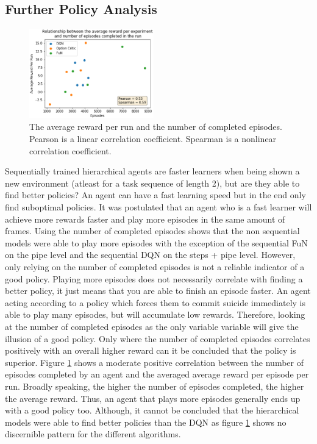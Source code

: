 \documentclass[notitlepage,a4paper,11pt]{article}
\begin{document}
\subsection{Further Policy Analysis}
\begin{figure}
\vspace{-40pt}
  \begin{center}
    \includegraphics[width=0.48\textwidth]{figs/good_policy.eps}
  \end{center}
  \vspace{-20pt}
  \caption{The average reward per run and the number of completed episodes. Pearson is a linear correlation coefficient. Spearman is a nonlinear correlation coefficient.}
  \label{fig:good_policy}
\end{figure}

Sequentially trained hierarchical agents are faster learners when being shown a new environment (atleast for a task sequence of length 2), but are they able to find better policies? An agent can have a fast learning speed but in the end only find suboptimal policies. It was postulated that an agent who is a fast learner will achieve more rewards faster and play more episodes in the same amount of frames. Using the number of completed episodes shows that the non sequential models were able to play more episodes with the exception of the sequential FuN on the pipe level and the sequential DQN on the steps + pipe level. However, only relying on the number of completed episodes is not a reliable indicator of a good policy. Playing more episodes does not necessarily correlate with finding a better policy, it just means that you are able to finish an episode faster. An agent acting according to a policy which forces them to commit suicide immediately is able to play many episodes, but will accumulate low rewards. Therefore, looking at the number of completed episodes as the only variable variable will give the illusion of a good policy. Only where the number of completed episodes correlates positively with an overall higher reward can it be concluded that the policy is superior. Figure \ref{fig:good_policy} shows a moderate positive correlation between the number of episodes completed by an agent and the averaged average reward per episode per run. Broadly speaking, the higher the number of episodes completed, the higher the average reward. Thus, an agent that plays more episodes generally ends up with a good policy too. Although, it cannot be concluded that the hierarchical models were able to find better policies than the DQN as figure \ref{fig:good_policy} shows no discernible pattern for the different algorithms.  
\end{document}
